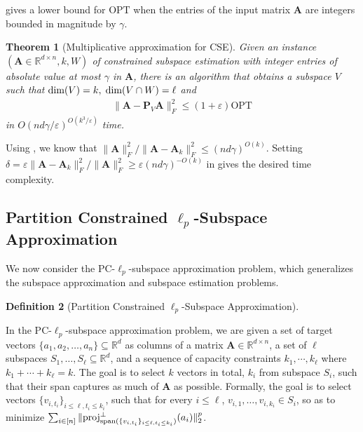 \documentclass[11pt]{article}
\makeatletter
\theoremstyle{plain}
\newtheorem{theorem}{Theorem}[section]
\theoremstyle{plain}
\theoremstyle{definition}
\newtheorem{defn}[theorem]{Definition}
\theoremstyle{plain}
\theoremstyle{remark}
\newenvironment{proof}[1][\protect\proofname]{\par
	\normalfont\topsep6\p@\@plus6\p@\relax
	\trivlist
	\itemindent\parindent
	\item[\hskip\labelsep\scshape #1]\ignorespaces
}{\endtrivlist\@endpefalse
}
\providecommand{\proofname}{Proof}
\newcommand{\RR}{\mathbb{R}}
\newcommand{\opt}{\ensuremath{\text{OPT}}\xspace}
\DeclareRobustCommand{\fairSAp}[1]{PC-$\ell_{#1}$-subspace approximation}
\DeclareRobustCommand{\proj}{\mbox{proj}}
\makeatother
\begin{document}
 gives a lower bound for $\opt$ when the entries of the input matrix $\bm{A}$ are integers bounded in magnitude by $\gamma$.


\begin{theorem}[Multiplicative approximation for CSE]\label{thm:CSE-multiplicative}
    Given an instance $(\bm{A}\in \RR^{d\times n}, k, W)$ of constrained subspace estimation with integer entries of absolute value at most $\gamma$ in $\bm{A}$, there is an algorithm that obtains a subspace $V$ such that $\textnormal{dim}(V)=k,\; \textnormal{dim}(V \cap W)= \ell$ and 
    \begin{align*}
        \|\bm{A}-\bm{P}_V\bm{A}\|_F^2 \leq (1+\varepsilon)\opt
    \end{align*}
 in $ O(nd\gamma/\varepsilon)^{O(k^3/\varepsilon)}$ time. 
\end{theorem}
\begin{proof}
Using , we know that $\|\bm{A}\|_F^2/\|\bm{A}-\bm{A}_k\|_F^2\leq (nd\gamma)^{O(k)}$. Setting $\delta= \varepsilon\|\bm{A}-\bm{A}_k\|_F^2/\|\bm{A}\|_F^2\geq \varepsilon (nd\gamma)^{-O(k)}$ in  gives the desired time complexity.  
\end{proof}


\subsection{Partition Constrained $\ell_p$-Subspace Approximation}\label{sec:subspace-approximation-main}
We now consider the \fairSAp{p} problem, which generalizes the subspace approximation and subspace estimation problems. 

\begin{defn}[Partition Constrained $\ell_p$-Subspace Approximation]\label{def:constrained-subspace-selection}

In the \fairSAp{p} problem, we are given a set of target vectors $\{a_1,a_2,\dots,a_n\}\subseteq \RR^d$ as columns of a matrix $\bm{A}\in \RR^{d\times n}$, a set of $\ell$ subspaces $S_1,\dots,S_\ell \subseteq \RR^d$, and a sequence of capacity constraints $k_1, \cdots, k_\ell$ where $k_1 + \cdots + k_\ell = k$. The goal is to select $k$ vectors in total, $k_i$ from subspace $S_i$, such that their span captures as much of $\bm{A}$ as possible. Formally, the goal is to select vectors $\{v_{i,t_i}\}_{i\le \ell, t_i\le k_i}$, such that for every $i\le \ell$, $v_{i,1},\dots, v_{i,k_i} \in S_i$, so as to minimize $ \sum_{i\in [n]}\|\proj^{\bot}_{\textnormal{span}(\{v_{i,t_i}\}_{i\le \ell, t_i\le k_i})}(a_i)\|_2^p $.  
\end{defn}
\end{document}
